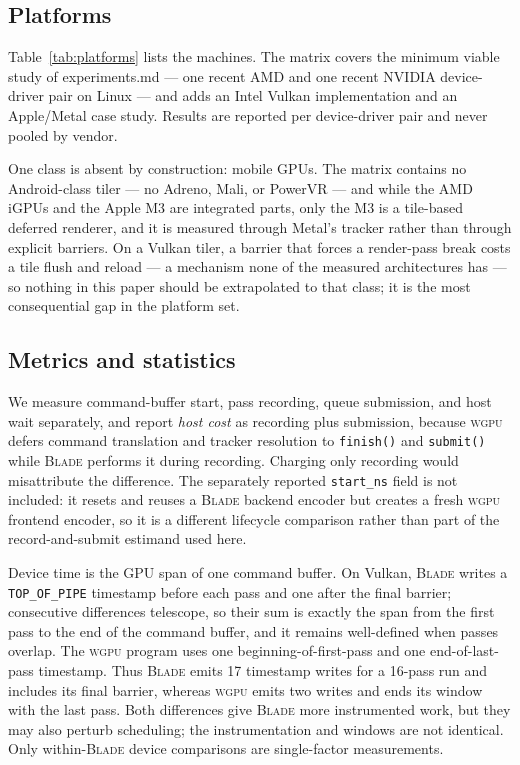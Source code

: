 \documentclass[10pt,twocolumn]{article}
\newcommand{\blade}{\textsc{Blade}}
\newcommand{\wgpu}{\textsc{wgpu}}
\begin{document}
\subsection{Platforms}

Table~\ref{tab:platforms} lists the machines. The matrix covers the minimum
viable study of experiments.md --- one recent AMD and one recent NVIDIA
device-driver pair on Linux --- and adds an Intel Vulkan implementation and an
Apple/Metal case study. Results are reported per device-driver pair and never
pooled by vendor.

One class is absent by construction: mobile GPUs. The matrix contains no
Android-class tiler --- no Adreno, Mali, or PowerVR --- and while the AMD
iGPUs and the Apple M3 are integrated parts, only the M3 is a tile-based
deferred renderer, and it is measured through Metal's tracker rather than
through explicit barriers. On a Vulkan tiler, a barrier that forces a
render-pass break costs a tile flush and reload --- a mechanism none of the
measured architectures has --- so nothing in this paper should be
extrapolated to that class; it is the most consequential gap in the platform
set.



\subsection{Metrics and statistics}

We measure command-buffer start, pass recording, queue submission, and host
wait separately, and report \emph{host cost} as recording plus submission,
because \wgpu{} defers command translation and tracker resolution to
\texttt{finish()} and \texttt{submit()} while \blade{} performs it during
recording. Charging only recording would misattribute the difference. The
separately reported \texttt{start\_ns} field is not included: it resets and
reuses a \blade{} backend encoder but creates a fresh \wgpu{} frontend encoder,
so it is a different lifecycle comparison rather than part of the
record-and-submit estimand used here.

Device time is the GPU span of one command buffer. On Vulkan, \blade{} writes a
\texttt{TOP\_OF\_PIPE} timestamp before each pass and one after the final
barrier; consecutive differences telescope, so their sum is exactly the span
from the first pass to the end of the command buffer, and it remains
well-defined when passes overlap. The \wgpu{} program uses one
beginning-of-first-pass and one end-of-last-pass timestamp. Thus \blade{} emits
17 timestamp writes for a 16-pass run and includes its final barrier, whereas
\wgpu{} emits two writes and ends its window with the last pass. Both
differences give \blade{} more instrumented work, but they may also perturb
scheduling; the instrumentation and windows are not identical. Only
within-\blade{} device comparisons are single-factor measurements.
\end{document}

